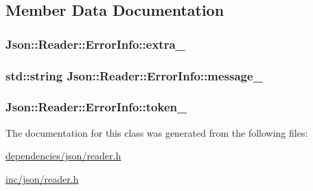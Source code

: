 \subsection{Member Data Documentation}
\hypertarget{classJson_1_1Reader_1_1ErrorInfo_af92c24acf642b040d6e40aac4952d44d}{
\subsubsection[{extra\-\_\-}]{ Json\-::\-Reader\-::\-Error\-Info\-::extra\-\_\-}}\label{db/d1f/classJson_1_1Reader_1_1ErrorInfo_af92c24acf642b040d6e40aac4952d44d}
\hypertarget{classJson_1_1Reader_1_1ErrorInfo_aeb2fb6537a8bb978b239ea1482d73d7a}{
\subsubsection[{message\-\_\-}]{\setlength{\rightskip}{0pt plus 5cm}std\-::string Json\-::\-Reader\-::\-Error\-Info\-::message\-\_\-}}\label{db/d1f/classJson_1_1Reader_1_1ErrorInfo_aeb2fb6537a8bb978b239ea1482d73d7a}
\hypertarget{classJson_1_1Reader_1_1ErrorInfo_a52e1c71b12eb1c3f0395d7ef1e778ce6}{
\subsubsection[{token\-\_\-}]{ Json\-::\-Reader\-::\-Error\-Info\-::token\-\_\-}}\label{db/d1f/classJson_1_1Reader_1_1ErrorInfo_a52e1c71b12eb1c3f0395d7ef1e778ce6}


The documentation for this class was generated from the following files\-:\begin{DoxyCompactItemize}
\item 
\hyperlink{dependencies_2json_2reader_8h}{dependencies/json/reader.\-h}\item 
\hyperlink{inc_2json_2reader_8h}{inc/json/reader.\-h}\end{DoxyCompactItemize}
